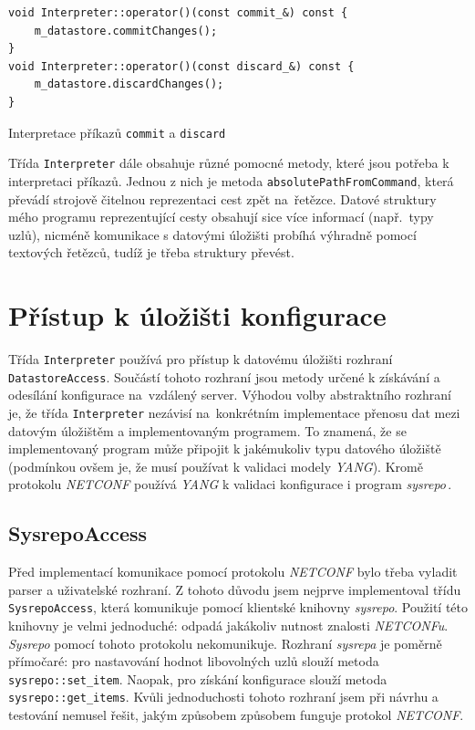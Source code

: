 \documentclass[thesis=B,czech,hidelinks]{FITthesis}[2019/03/06]
\begin{document}
\begin{listing}
\begin{verbatim}
void Interpreter::operator()(const commit_&) const {
    m_datastore.commitChanges();
}
void Interpreter::operator()(const discard_&) const {
    m_datastore.discardChanges();
}
\end{verbatim}
\caption{Interpretace příkazů \texttt{commit} a \texttt{discard}}\label{interpreter:commit:discard}
\end{listing}

Třída \texttt{Interpreter} dále obsahuje různé pomocné metody, které jsou potřeba k interpretaci příkazů. Jednou z nich je metoda \texttt{absolutePathFromCommand}, která převádí strojově čitelnou reprezentaci cest zpět na~řetězce. Datové struktury mého programu reprezentující cesty obsahují sice více informací (např.\ typy uzlů), nicméně komunikace s datovými úložišti probíhá výhradně pomocí textových řetězců, tudíž je třeba struktury převést.


\section{Přístup k úložišti konfigurace}\label{datastore:access}
Třída \texttt{Interpreter} používá pro přístup k datovému úložišti rozhraní \texttt{DatastoreAccess}. Součástí tohoto rozhraní jsou metody určené k získávání a odesílání konfigurace na~vzdálený server. Výhodou volby abstraktního rozhraní je, že třída \texttt{Interpreter} nezávisí na~konkrétním implementace přenosu dat mezi datovým úložištěm a implementovaným programem. To znamená, že se implementovaný program může připojit k jakémukoliv typu datového úložiště (podmínkou ovšem je, že musí používat k validaci modely \textit{YANG}). Kromě protokolu \textit{NETCONF} používá \textit{YANG} k validaci konfigurace i program \textit{sysrepo}\,\cite{sysrepo}.

\subsection{SysrepoAccess}
Před implementací komunikace pomocí protokolu \textit{NETCONF} bylo třeba vyladit parser a uživatelské rozhraní. Z tohoto důvodu jsem nejprve implementoval třídu \texttt{SysrepoAccess}, která komunikuje pomocí klientské knihovny \textit{sysrepo}. Použití této knihovny je velmi jednoduché: odpadá jakákoliv nutnost znalosti \textit{NETCONFu}. \textit{Sysrepo} pomocí tohoto protokolu nekomunikuje. Rozhraní \textit{sysrepa} je poměrně přímočaré: pro nastavování hodnot libovolných uzlů slouží metoda \texttt{sysrepo::set\_item}. Naopak, pro získání konfigurace slouží metoda \texttt{sysrepo::get\_items}. Kvůli jednoduchosti tohoto rozhraní jsem při návrhu a testování nemusel řešit, jakým způsobem způsobem funguje protokol \textit{NETCONF}.
\end{document}

